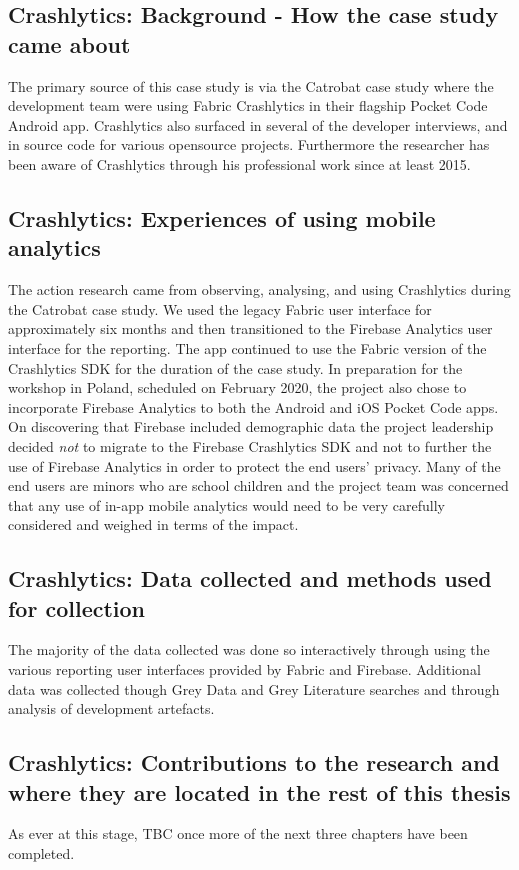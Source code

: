 \subsection{Crashlytics: Background - How the case study came about}
The primary source of this case study is via the Catrobat case study where the development team were using Fabric Crashlytics in their flagship Pocket Code Android app. Crashlytics also surfaced in several of the developer interviews, and in source code for various opensource projects. Furthermore the researcher has been aware of Crashlytics through his professional work since at least 2015.

\subsection{Crashlytics: Experiences of using mobile analytics}
The action research came from observing, analysing, and using Crashlytics during the Catrobat case study. We used the legacy Fabric user interface for approximately six months and then transitioned to the Firebase Analytics user interface for the reporting. The app continued to use the Fabric version of the Crashlytics SDK for the duration of the case study. In preparation for the workshop in Poland, scheduled on  February 2020, the project also chose to incorporate Firebase Analytics to both the Android and iOS Pocket Code apps. On discovering that Firebase included demographic data the project leadership decided \emph{not} to migrate to the Firebase Crashlytics SDK and not to further the use of Firebase Analytics in order to protect the end users' privacy. Many of the end users are minors who are school children and the project team was concerned that any use of in-app mobile analytics would need to be very carefully considered and weighed in terms of the impact.

\subsection{Crashlytics: Data collected and methods used for collection}
The majority of the data collected was done so interactively through using the various reporting user interfaces provided by Fabric and Firebase. Additional data was collected though Grey Data and Grey Literature searches and through analysis of development artefacts.

\subsection{Crashlytics: Contributions to the research and where they are located in the rest of this thesis}
As ever at this stage, TBC once more of the next three chapters have been completed.

